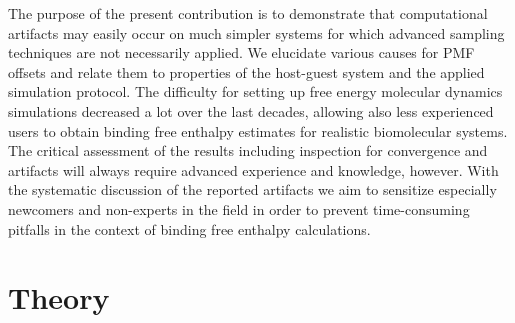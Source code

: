 \documentclass[9pt,lessons]{livecoms}
\begin{document}
The purpose of the present contribution is to demonstrate that computational artifacts may easily occur on much simpler systems for which advanced sampling techniques are not necessarily applied.
We elucidate various causes for PMF offsets and relate them to properties of the host-guest system and the applied simulation protocol.
The difficulty for setting up free energy molecular dynamics simulations decreased a lot over the last decades, allowing also less experienced users to obtain binding free enthalpy estimates for realistic biomolecular systems.
The critical assessment of the results including inspection for convergence and artifacts will always require advanced experience and knowledge, however.
With the systematic discussion of the reported artifacts we aim to sensitize especially newcomers and non-experts in the field in order to prevent time-consuming pitfalls in the context of binding free enthalpy calculations.

\section{Theory}
\label{sec:theory_DG0}
\end{document}
